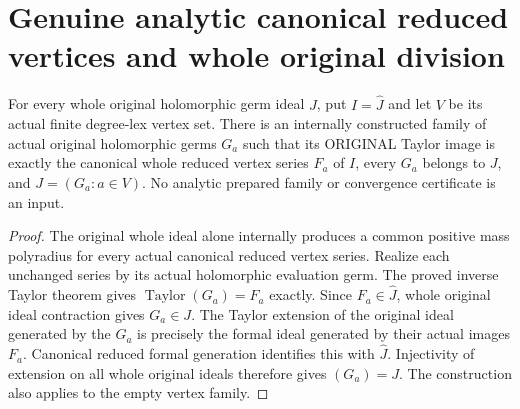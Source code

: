 \section{Genuine analytic canonical reduced vertices and whole original division}

\begin{theorem}
\label{hir:actual-original-canonical-reduced-vertex-basis}
\leanok
For every whole original holomorphic germ ideal $J$, put $I=\widehat J$
and let $V$ be its actual finite degree-lex vertex set. There is an internally
constructed family of actual original holomorphic germs $G_a$ such that
its ORIGINAL Taylor image is exactly the canonical whole reduced vertex
series $F_a$ of $I$, every $G_a$ belongs to $J$, and $J=(G_a:a\in V)$.
No analytic prepared family or convergence certificate is an input.
\end{theorem}
\begin{proof}
The original whole ideal alone internally produces a common positive mass
polyradius for every actual canonical reduced vertex series. Realize each
unchanged series by its actual holomorphic evaluation germ. The proved
inverse Taylor theorem gives $\operatorname{Taylor}(G_a)=F_a$ exactly.
Since $F_a\in\widehat J$, whole original ideal contraction gives $G_a\in J$.
The Taylor extension of the original ideal generated by the $G_a$ is
precisely the formal ideal generated by their actual images $F_a$.
Canonical reduced formal generation identifies this with $\widehat J$.
Injectivity of extension on all whole original ideals therefore gives
$(G_a)=J$. The construction also applies to the empty vertex family.
\end{proof}

